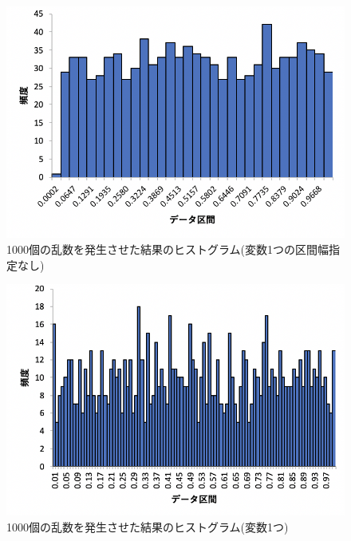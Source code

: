 \documentclass[12pt]{jarticle}
\begin{document}
\begin{figure}[h]
    \begin{center}
        \includegraphics[scale=0.8]{kadai4_2graph1.png}
    \end{center}
    \caption{1000個の乱数を発生させた結果のヒストグラム(変数1つの区間幅指定なし)}
\end{figure}
\begin{figure}[h]
    \begin{center}
        \includegraphics[scale=0.8]{kadai4_2graph2.png}
    \end{center}
    \caption{1000個の乱数を発生させた結果のヒストグラム(変数1つ)}
\end{figure}
\end{document}
